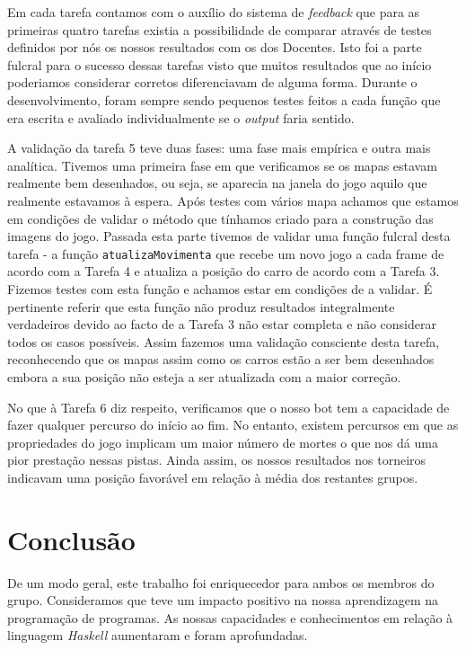 \documentclass[a4paper]{report}
\begin{document}
Em cada tarefa contamos com o auxílio do sistema de \emph{feedback} que para
as primeiras quatro tarefas existia a possibilidade de comparar através de
testes definidos por nós os nossos resultados com os dos Docentes. Isto foi a
parte fulcral para o sucesso dessas tarefas visto que muitos resultados que ao
início poderiamos considerar corretos diferenciavam de alguma forma. Durante
o desenvolvimento, foram sempre sendo pequenos testes feitos a cada função que
era escrita e avaliado individualmente se o \emph{output} faria sentido.

A validação da tarefa 5 teve duas fases: uma fase mais empírica e outra mais
analítica. Tivemos uma primeira fase em que verificamos se os mapas estavam
realmente bem desenhados, ou seja, se aparecia na janela do jogo aquilo que
realmente estavamos à espera. Após testes com vários mapa achamos que estamos em
condições de validar o método que tínhamos criado para a construção das imagens
do jogo. Passada esta parte tivemos de validar uma função fulcral desta tarefa -
a função \texttt{atualizaMovimenta} que recebe um novo jogo a cada frame de
acordo com a Tarefa 4 e atualiza a posição do carro de acordo com a Tarefa 3.
Fizemos testes com esta função e achamos estar em condições de a validar. É
pertinente referir que esta função não produz resultados integralmente
verdadeiros devido ao facto de a Tarefa 3 não estar completa e não considerar
todos os casos possíveis. Assim fazemos uma validação consciente desta tarefa,
reconhecendo que os mapas assim como os carros estão a ser bem desenhados embora
a sua posição não esteja a ser atualizada com a maior correção.

No que à Tarefa 6 diz respeito, verificamos que o nosso bot tem a capacidade de
fazer qualquer percurso do início ao fim. No entanto, existem percursos em que
as propriedades do jogo implicam um maior número de mortes o que nos dá uma
pior prestação nessas pistas. Ainda assim, os nossos resultados nos torneiros
indicavam uma posição favorável em relação à média dos restantes grupos.

\chapter{Conclusão}

De um modo geral, este trabalho foi enriquecedor para ambos os membros do grupo.
Consideramos que teve um impacto positivo na nossa aprendizagem na programação
de programas. As nossas capacidades e conhecimentos em relação à linguagem
\emph{Haskell} aumentaram e foram aprofundadas.
\end{document}
